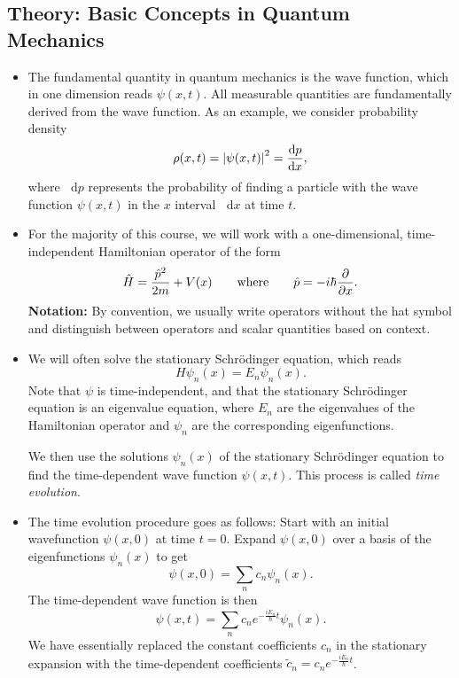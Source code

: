 \documentclass[11pt, a4paper]{article}
\newcommand{\diff}{\mathop{}\!\mathrm{d}} %
\newcommand{\eqtext}[1]{\qquad \text{#1} \qquad}
\newcommand{\Schro}{Schr\"{o}dinger\xspace}
\newcommand{\Ham}{Hamiltonian\xspace}
\renewcommand{\op}[1]{\hat{#1}} %
\newcommand{\p}{\psi}  %
\begin{document}
\subsection{Theory: Basic Concepts in Quantum Mechanics}
\begin{itemize}
	\item The fundamental quantity in quantum mechanics is the wave function, which in one dimension reads $ \psi(x, t) $. All measurable quantities are fundamentally derived from the wave function. As an example, we consider probability density
	\begin{equation*}
		\rho(x, t) = \abs{\psi(x, t)}^{2} = \dv{p}{x},
	\end{equation*}
	where $ \diff p $ represents the probability of finding a particle with the wave function $ \psi(x, t) $ in the $ x $ interval $ \diff x $ at time $ t $. 
		
    \item For the majority of this course, we will work with a one-dimensional, time-independent \Ham operator of the form
	\begin{equation*}
		\op{H} = \frac{\op{p}^{2}}{2m} + V(x) \eqtext{where} \op{p} = - i\hbar \pdv{}{x}.
	\end{equation*}
	\textbf{Notation:} By convention, we usually write operators without the hat symbol and distinguish between operators and scalar quantities based on context.
	
	\item We will often solve the stationary \Schro equation, which reads
	\begin{equation*}
		H\psi_{n}(x) = E_{n}\psi_{n}(x).
	\end{equation*}
    Note that $ \p $ is time-independent, and that the stationary \Schro equation is an eigenvalue equation, where $ E_{n} $ are the eigenvalues of the Hamiltonian operator and $ \psi_{n} $ are the corresponding eigenfunctions.
	
	We then use the solutions $ \psi_{n}(x) $ of the stationary \Schro equation to find the time-dependent wave function $ \psi(x, t) $. This process is called \textit{time evolution}. 
	
	\item The time evolution procedure goes as follows: Start with an initial wavefunction $ \psi(x, 0) $ at time $ t = 0 $. Expand $ \psi(x, 0) $ over a basis of the eigenfunctions $ \psi_{n}(x) $ to get
	\begin{equation*}
		\psi(x, 0) = \sum_{n} c_{n} \psi_{n}(x).
	\end{equation*}
	The time-dependent wave function is then
	\begin{equation*}
		\psi(x, t) = \sum_{n} c_{n}e^{-\frac{iE_{n}}{\hbar}t}\psi_{n}(x).
	\end{equation*}
	We have essentially replaced the constant coefficients $ c_{n} $ in the stationary expansion with the time-dependent coefficients $ \tilde{c}_{n} = c_{n}e^{-\frac{iE_{n}}{\hbar}t} $.
	

\end{itemize}
\end{document}
